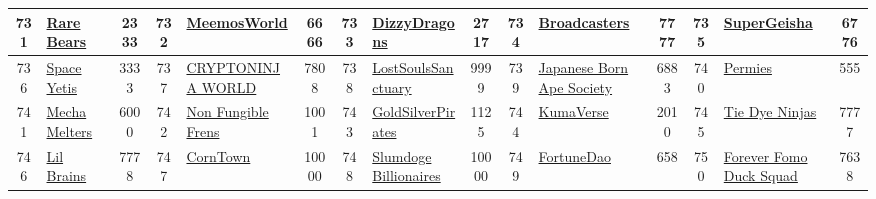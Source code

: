 \begin{table*}[]
{\begin{tabular}{|c|l|c|c|l|c|c|l|c|c|l|c|c|l|c|}
        731   & \href{https://rarebearsnft.com}{Rare Bears}                                        & 2333              & 732   & \href{https://meemosworld.com}{MeemosWorld}                                                       & 6666              & 733   & \href{https://dizzydragons.club/}{DizzyDragons}                                   & 2717              & 734   & \href{http://bcsnft.io/}{Broadcasters}                                        & 7777              & 735   & \href{https://www.supergeisha.io/}{SuperGeisha}                                           & 6776                                    \\ \hline
        736   & \href{https://beyondearthonline.io}{Space Yetis}                                   & 3333              & 737   & \href{https://opensea.io/collection/startjpn-cryptoninja-world}{CRYPTONINJA WORLD}                & 7808              & 738   & \href{https://nftyswap.org}{LostSoulsSanctuary}                                   & 9999              & 739   & \href{https://www.japanesebornapesociety.com/}{Japanese Born Ape Society}     & 6883              & 740   & \href{https://blockworks.co/nft}{Permies}                                                 & 555                                     \\ \hline
        741   & \href{http://creepycreams.com}{Mecha Melters}                                      & 6000              & 742   & \href{https://www.nonfungiblefrens.com}{Non Fungible Frens}                                       & 1001              & 743   & \href{https://goldsilverpirates.com}{GoldSilverPirates}                           & 1125              & 744   & \href{https://www.kumaverse.xyz/}{KumaVerse}                                  & 2010              & 745   & \href{https://tiedyeninjas.com/}{Tie Dye Ninjas}                                          & 7777                                    \\ \hline
        746   & \href{https://www.lilbrains.com}{Lil Brains}                                       & 7778              & 747   & \href{https://corntown.wtf}{CornTown}                                                             & 10000             & 748   & \href{https://slumdoges.com/}{Slumdoge Billionaires}                              & 10000             & 749   & \href{http://aerfa.io}{FortuneDao}                                            & 658               & 750   & \href{https://highstreet.market}{Forever Fomo Duck Squad}                                 & 7638                                    \\ \hline

\end{tabular}}
\end{table*}
